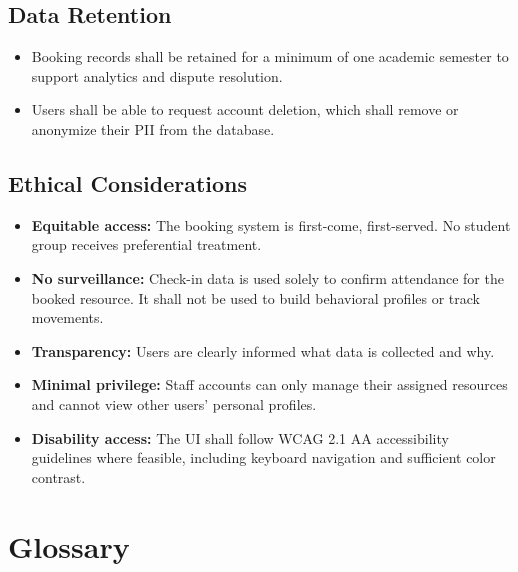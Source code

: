 \documentclass[12pt]{article}
\begin{document}
\subsection{Data Retention}
\begin{itemize}
    \item Booking records shall be retained for a minimum of one academic semester to support analytics and dispute resolution.
    \item Users shall be able to request account deletion, which shall remove or anonymize their PII from the database.
\end{itemize}

\subsection{Ethical Considerations}
\begin{itemize}
    \item \textbf{Equitable access:} The booking system is first-come, first-served. No student group receives preferential treatment.
    \item \textbf{No surveillance:} Check-in data is used solely to confirm attendance for the booked resource. It shall not be used to build behavioral profiles or track movements.
    \item \textbf{Transparency:} Users are clearly informed what data is collected and why.
    \item \textbf{Minimal privilege:} Staff accounts can only manage their assigned resources and cannot view other users' personal profiles.
    \item \textbf{Disability access:} The UI shall follow WCAG 2.1 AA accessibility guidelines where feasible, including keyboard navigation and sufficient color contrast.
\end{itemize}

\section*{Glossary}
\end{document}
